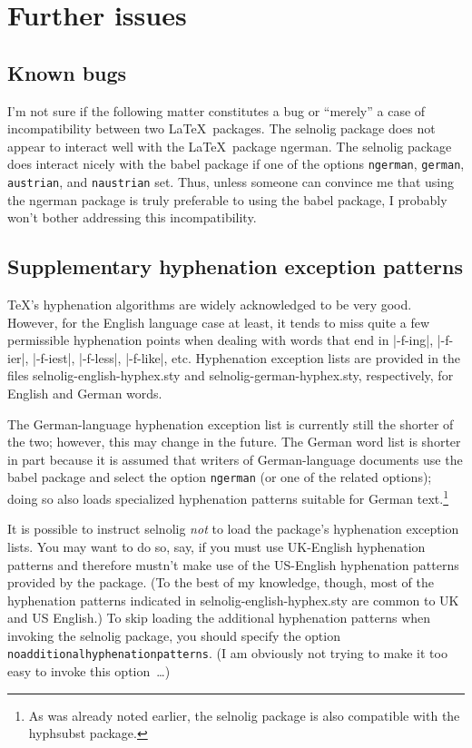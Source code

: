 \documentclass[11pt]{article}
\newcommand{\pkg}[1]{\textsf{#1}}
\newcommand{\opt}[1]{\texttt{#1}}
\begin{document}
\section{Further issues}

\subsection{Known bugs}

I'm not sure if the following matter constitutes a bug or \enquote{merely} a case of incompatibility between two \LaTeX\ packages. The \pkg{selnolig} package does not appear to interact well with the \LaTeX\ package \pkg{ngerman}. The \pkg{selnolig} package does interact nicely with the \pkg{babel} package if one of the options \opt{ngerman}, \opt{german}, \opt{austrian}, and \opt{naustrian} set. Thus, unless someone can convince me that using the \pkg{ngerman} package is truly preferable to using the \pkg{babel} package, I probably won't bother addressing this incompatibility.



\subsection{Supplementary hyphenation exception patterns} \label{sec:addlhyph}

\TeX's hyphenation algorithms are widely acknowledged to be very good. However, for the English language case at least, it tends to miss quite a few permissible hyphenation points when dealing with words that end in |-f-ing|, |-f-ier|, |-f-iest|, |-f-less|, |-f-like|, etc. Hyphenation exception lists are provided in the files \pkg{selnolig-english-hyphex.sty} and \pkg{selnolig-german-hyphex.sty}, respectively, for English and German words.

The German-language hyphenation exception list is currently still the shorter of the two; however, this may change in the future. The German word list is shorter in part because it is assumed that writers of German-language documents use the \pkg{babel} package and select the option \opt{ngerman} (or one of the related options); doing so also loads specialized hyphenation patterns suitable for German text.\footnote{As was already noted earlier, the \pkg{selnolig} package is also compatible with the \pkg{hyphsubst} package.} 

It is possible to instruct \pkg{selnolig} \emph{not} to load the package's hyphenation exception lists. You may want to do so, say, if you must use UK-English hyphenation patterns and therefore mustn't make use of the US-English hyphenation patterns provided by the package. (To the best of my knowledge, though, most of the hyphenation patterns indicated in \pkg{selnolig-english-hyphex.sty} are common to UK and US English.) To skip loading the additional hyphenation patterns when invoking the \pkg{selnolig} package, you should specify the option \opt{noadditional\-hyphen\-a\-tion\-patterns}. (I am obviously not trying to make it too easy to invoke this option~\dots)
\end{document}
